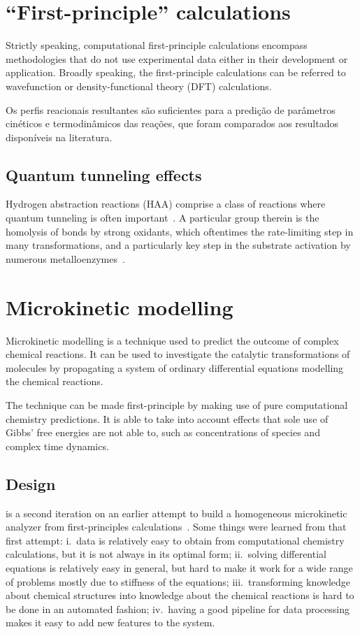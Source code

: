 \section{``First-principle'' calculations}

Strictly speaking,
computational first-principle calculations encompass
methodologies that do not use experimental data either in their development or
application.
Broadly speaking,
the first-principle calculations can be referred to
wavefunction or density-functional theory (DFT) calculations.

Os perfis reacionais resultantes são suficientes para a predição de parâmetros
cinéticos e termodinâmicos das reações,
que foram comparados aos resultados
disponíveis na literatura.

\subsection{Quantum tunneling effects}

Hydrogen abstraction reactions (HAA) comprise a class of reactions where
quantum tunneling is often important~\cite{Bim2018}.
A particular group therein is the homolysis of  bonds by strong
oxidants,
which oftentimes the rate-limiting step in many transformations,
and
a particularly key step in the substrate activation by numerous
metalloenzymes~\cite{Bim2018}.

\section{Microkinetic modelling}

Microkinetic modelling is a technique used to predict the outcome of complex
chemical reactions.
It can be used to investigate the catalytic transformations of molecules by
propagating a system of ordinary differential equations modelling the chemical
reactions.

The technique can be made first-principle by making use of pure computational
chemistry predictions.
It is able to take into account effects that sole use of Gibbs' free energies
are not able to,
such as concentrations of species and complex time dynamics.

\subsection{Design}

\overreact is a second iteration on an earlier attempt to build a
homogeneous microkinetic analyzer from first-principles
calculations~\cite{pyrrole2019zenodo}.
Some things were learned from that first attempt:
i.\ data is relatively easy to obtain from computational chemistry calculations,
but it is not always in its optimal form;
ii.\ solving differential equations is relatively easy in general,
but hard to
make it work for a wide range of problems mostly due to stiffness of the
equations;
iii.\ transforming knowledge about chemical structures into knowledge about the
chemical reactions is hard to be done in an automated fashion;
iv.\ having a good pipeline for data processing makes it easy to add new
features to the system.

